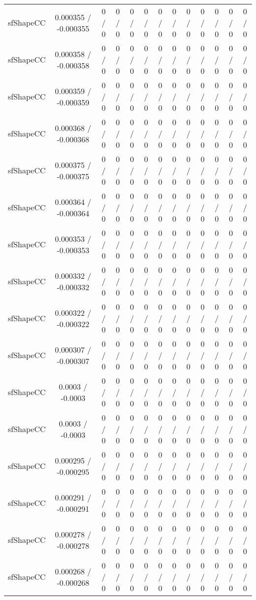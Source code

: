 \documentclass[10pt]{article}
\begin{document}
\begin{table}[htbp]
\begin{center}
\begin{tabular}{|c|c|c|c|c|c|c|c|c|c|c|c|c|}
  sfShapeCC & 0.000355 / -0.000355 & 0 / 0 & 0 / 0 & 0 / 0 & 0 / 0 & 0 / 0 & 0 / 0 & 0 / 0 & 0 / 0 & 0 / 0 & 0 / 0 & 0 / 0 \\ 
  sfShapeCC & 0.000358 / -0.000358 & 0 / 0 & 0 / 0 & 0 / 0 & 0 / 0 & 0 / 0 & 0 / 0 & 0 / 0 & 0 / 0 & 0 / 0 & 0 / 0 & 0 / 0 \\ 
  sfShapeCC & 0.000359 / -0.000359 & 0 / 0 & 0 / 0 & 0 / 0 & 0 / 0 & 0 / 0 & 0 / 0 & 0 / 0 & 0 / 0 & 0 / 0 & 0 / 0 & 0 / 0 \\ 
  sfShapeCC & 0.000368 / -0.000368 & 0 / 0 & 0 / 0 & 0 / 0 & 0 / 0 & 0 / 0 & 0 / 0 & 0 / 0 & 0 / 0 & 0 / 0 & 0 / 0 & 0 / 0 \\ 
  sfShapeCC & 0.000375 / -0.000375 & 0 / 0 & 0 / 0 & 0 / 0 & 0 / 0 & 0 / 0 & 0 / 0 & 0 / 0 & 0 / 0 & 0 / 0 & 0 / 0 & 0 / 0 \\ 
  sfShapeCC & 0.000364 / -0.000364 & 0 / 0 & 0 / 0 & 0 / 0 & 0 / 0 & 0 / 0 & 0 / 0 & 0 / 0 & 0 / 0 & 0 / 0 & 0 / 0 & 0 / 0 \\ 
  sfShapeCC & 0.000353 / -0.000353 & 0 / 0 & 0 / 0 & 0 / 0 & 0 / 0 & 0 / 0 & 0 / 0 & 0 / 0 & 0 / 0 & 0 / 0 & 0 / 0 & 0 / 0 \\ 
  sfShapeCC & 0.000332 / -0.000332 & 0 / 0 & 0 / 0 & 0 / 0 & 0 / 0 & 0 / 0 & 0 / 0 & 0 / 0 & 0 / 0 & 0 / 0 & 0 / 0 & 0 / 0 \\ 
  sfShapeCC & 0.000322 / -0.000322 & 0 / 0 & 0 / 0 & 0 / 0 & 0 / 0 & 0 / 0 & 0 / 0 & 0 / 0 & 0 / 0 & 0 / 0 & 0 / 0 & 0 / 0 \\ 
  sfShapeCC & 0.000307 / -0.000307 & 0 / 0 & 0 / 0 & 0 / 0 & 0 / 0 & 0 / 0 & 0 / 0 & 0 / 0 & 0 / 0 & 0 / 0 & 0 / 0 & 0 / 0 \\ 
  sfShapeCC & 0.0003 / -0.0003 & 0 / 0 & 0 / 0 & 0 / 0 & 0 / 0 & 0 / 0 & 0 / 0 & 0 / 0 & 0 / 0 & 0 / 0 & 0 / 0 & 0 / 0 \\ 
  sfShapeCC & 0.0003 / -0.0003 & 0 / 0 & 0 / 0 & 0 / 0 & 0 / 0 & 0 / 0 & 0 / 0 & 0 / 0 & 0 / 0 & 0 / 0 & 0 / 0 & 0 / 0 \\ 
  sfShapeCC & 0.000295 / -0.000295 & 0 / 0 & 0 / 0 & 0 / 0 & 0 / 0 & 0 / 0 & 0 / 0 & 0 / 0 & 0 / 0 & 0 / 0 & 0 / 0 & 0 / 0 \\ 
  sfShapeCC & 0.000291 / -0.000291 & 0 / 0 & 0 / 0 & 0 / 0 & 0 / 0 & 0 / 0 & 0 / 0 & 0 / 0 & 0 / 0 & 0 / 0 & 0 / 0 & 0 / 0 \\ 
  sfShapeCC & 0.000278 / -0.000278 & 0 / 0 & 0 / 0 & 0 / 0 & 0 / 0 & 0 / 0 & 0 / 0 & 0 / 0 & 0 / 0 & 0 / 0 & 0 / 0 & 0 / 0 \\ 
  sfShapeCC & 0.000268 / -0.000268 & 0 / 0 & 0 / 0 & 0 / 0 & 0 / 0 & 0 / 0 & 0 / 0 & 0 / 0 & 0 / 0 & 0 / 0 & 0 / 0 & 0 / 0 \\ 

\end{tabular}
\end{center}
\end{table}
\end{document}
